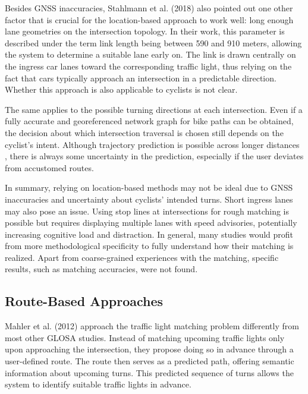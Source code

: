 Besides GNSS inaccuracies, Stahlmann et al. (2018) \cite{stahlmann_exploring_2018} also pointed out one other factor that is crucial for the location-based approach to work well: long enough lane geometries on the intersection topology. In their work, this parameter is described under the term link length being between 590 and 910 meters, allowing the system to determine a suitable lane early on. The link is drawn centrally on the ingress car lanes toward the corresponding traffic light, thus relying on the fact that cars typically approach an intersection in a predictable direction. Whether this approach is also applicable to cyclists is not clear. 

The same applies to the possible turning directions at each intersection. Even if a fully accurate and georeferenced network graph for bike paths can be obtained, the decision about which intersection traversal is chosen still depends on the cyclist's intent. Although trajectory prediction is possible across longer distances \cite{rudenko_human_2020}, there is always some uncertainty in the prediction, especially if the user deviates from accustomed routes.

In summary, relying on location-based methods may not be ideal due to GNSS inaccuracies and uncertainty about cyclists' intended turns. Short ingress lanes may also pose an issue. Using stop lines at intersections for rough matching is possible but requires displaying multiple lanes with speed advisories, potentially increasing cognitive load and distraction. In general, many studies would profit from more methodological specificity to fully understand how their matching is realized. Apart from coarse-grained experiences with the matching, specific results, such as matching accuracies, were not found.

\subsection{Route-Based Approaches}

Mahler et al. (2012) \cite{mahler_reducing_2012} approach the traffic light matching problem differently from most other GLOSA studies. Instead of matching upcoming traffic lights only upon approaching the intersection, they propose doing so in advance through a user-defined route. The route then serves as a predicted path, offering semantic information about upcoming turns. This predicted sequence of turns allows the system to identify suitable traffic lights in advance. 

